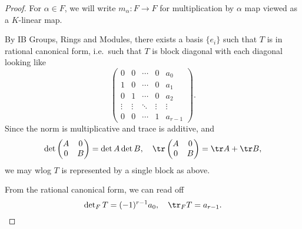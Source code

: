 \documentclass[a4paper]{article}
\begin{document}
\begin{proof}
  For $\alpha \in F$, we will write $m_\alpha: F \to F$ for multiplication by $\alpha$ map viewed as a $K$-linear map.

  By IB Groups, Rings and Modules, there exists a basis $\{e_i\}$ such that $T$ is in rational canonical form, i.e.\ such that $T$ is block diagonal with each diagonal looking like
  \[
    \begin{pmatrix}
      0 & 0 & \cdots & 0 & a_0\\
      1 & 0 & \cdots & 0 & a_1\\
      0 & 1 & \cdots & 0 & a_2\\
      \vdots & \vdots & \ddots & \vdots & \vdots\\
      0 & 0 & \cdots & 1 & a_{r - 1}
    \end{pmatrix}.
  \]
  Since the norm is multiplicative and trace is additive, and
  \[
    \det
    \begin{pmatrix}
      A & 0\\
      0 & B
    \end{pmatrix} = \det A \det B,\quad
    \tr
    \begin{pmatrix}
      A & 0\\
      0 & B
    \end{pmatrix} = \tr A + \tr B,
  \]
  we may wlog $T$ is represented by a single block as above.

  From the rational canonical form, we can read off
  \[
    \det\nolimits_F T = (-1)^{r - 1} a_0,\quad \tr_F T = a_{r - 1}.
  \]


\end{proof}
\end{document}
